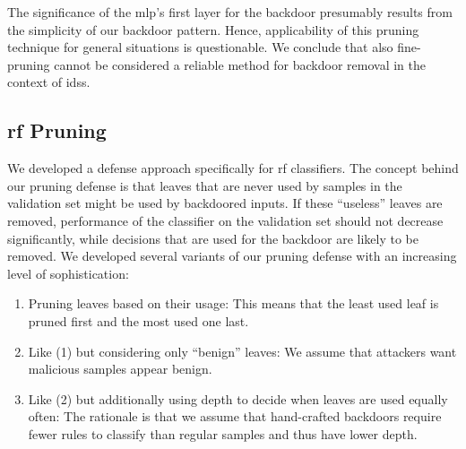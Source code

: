 \documentclass[9pt,sigconf,letterpaper,dvipsnames\ifx\removeHeaders\tempYes ,nonacm\fi]{acmart}
\newcommand\note[2]{{\color{#1}#2}}
\newcommand\todo[1]{{\note{red}{TODO: #1}}}
\begin{document}
The significance of the \gls{mlp}'s first layer for the backdoor presumably results from the simplicity of our backdoor pattern. Hence, applicability of this pruning technique for general situations is questionable. We conclude that also fine-pruning cannot be considered a reliable method for backdoor removal in the context of \glspl{ids}.


\subsection{\gls{rf} Pruning}

We developed a defense approach specifically for \gls{rf} classifiers.
The concept behind our pruning defense is that leaves that are never used by samples in the validation set might be used by backdoored inputs. If these ``useless'' leaves are removed, performance of the classifier on the validation set should not decrease
significantly,
while decisions that are used for the backdoor are likely to be removed.
We developed several variants of our pruning defense with an increasing level of sophistication:
\begin{enumerate}[wide, labelwidth=!, labelindent=0pt]
\item Pruning leaves based on their usage: This means that the least used leaf is pruned first and the most used one last.
\item Like (1) but considering only ``benign'' leaves: We assume that attackers want malicious samples appear benign.
\item Like (2) but additionally using depth to decide when
leaves are used equally often: The rationale is that we assume that hand-crafted backdoors require fewer rules to classify than regular samples and thus have lower depth.
\end{enumerate}
\end{document}
